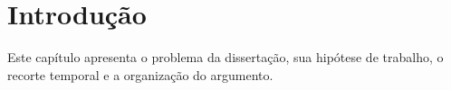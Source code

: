 \chapter{Introdução}

Este capítulo apresenta o problema da dissertação, sua hipótese de trabalho, o recorte temporal e a organização do argumento.


